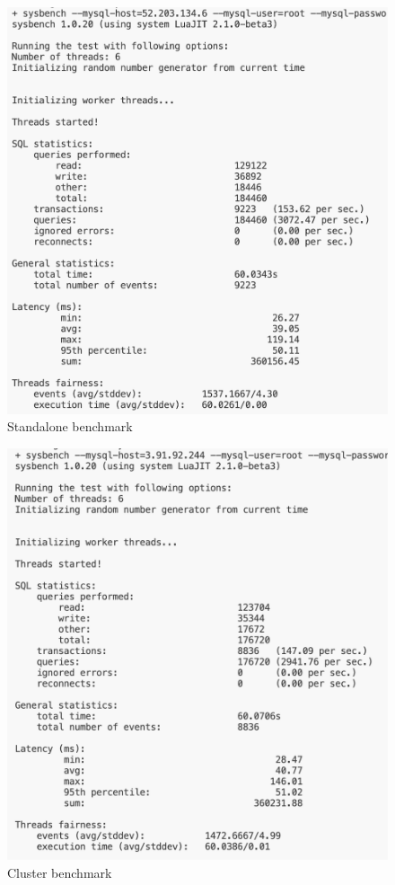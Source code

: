 \documentclass[letterpaper,headings=standardclasses,parskip=half]{scrartcl}
\begin{document}
\begin{figure}[h]
    \centering
    \includegraphics[width=0.75\linewidth]{figures/Screenshot 2023-12-25 at 16.42.56.png}
    \caption{Standalone benchmark}
    \label{fig:standalone_benchmark}
\end{figure}

\begin{figure}[h]
    \centering
    \includegraphics[width=0.75\linewidth]{figures/Screenshot 2023-12-25 at 16.53.44.png}
    \caption{Cluster benchmark}
    \label{fig:cluster_benchmark}
\end{figure}
\end{document}
